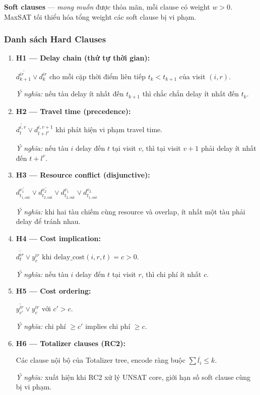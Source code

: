 \documentclass[11pt,a4paper]{article}
\begin{document}
\begin{softbox}
\textbf{Soft clauses} --- \emph{mong muốn} được thỏa mãn, mỗi clause có weight $w > 0$. MaxSAT tối thiểu hóa tổng weight các soft clause bị vi phạm.
\end{softbox}

\subsubsection{Danh sách Hard Clauses}

\begin{enumerate}
  \item \textbf{H1 --- Delay chain (thứ tự thời gian):}
  \begin{hardbox}
  $\overline{d_{k+1}^{ir}} \vee d_k^{ir}$ \quad cho mỗi cặp thời điểm liên tiếp $t_k < t_{k+1}$ của visit $(i,r)$.
  \end{hardbox}
  \emph{Ý nghĩa:} nếu tàu delay ít nhất đến $t_{k+1}$ thì chắc chắn delay ít nhất đến $t_k$.

  \item \textbf{H2 --- Travel time (precedence):}
  \begin{hardbox}
  $\overline{d_{t}^{i,v}} \vee d_{t+l^v}^{i,v+1}$ \quad khi phát hiện vi phạm travel time.
  \end{hardbox}
  \emph{Ý nghĩa:} nếu tàu $i$ delay đến $t$ tại visit $v$, thì tại visit $v+1$ phải delay ít nhất đến $t + l^v$.

  \item \textbf{H3 --- Resource conflict (disjunctive):}
  \begin{hardbox}
  $\overline{d_{t_{1,\text{out}}}^{v_1}} \vee \overline{d_{t_{2,\text{out}}}^{v_2}} \vee d_{t_{2,\text{out}}}^{v_1} \vee d_{t_{1,\text{out}}}^{v_2}$
  \end{hardbox}
  \emph{Ý nghĩa:} khi hai tàu chiếm cùng resource và overlap, ít nhất một tàu phải delay để tránh nhau.

  \item \textbf{H4 --- Cost implication:}
  \begin{hardbox}
  $\overline{d_t^{ir}} \vee y_c^{ir}$ \quad khi $\text{delay\_cost}(i, r, t) = c > 0$.
  \end{hardbox}
  \emph{Ý nghĩa:} nếu tàu $i$ delay đến $t$ tại visit $r$, thì chi phí ít nhất $c$.

  \item \textbf{H5 --- Cost ordering:}
  \begin{hardbox}
  $\overline{y_{c'}^{ir}} \vee y_c^{ir}$ \quad với $c' > c$.
  \end{hardbox}
  \emph{Ý nghĩa:} chi phí $\geq c'$ implies chi phí $\geq c$.

  \item \textbf{H6 --- Totalizer clauses (RC2):}
  \begin{hardbox}
  Các clause nội bộ của Totalizer tree, encode ràng buộc $\sum \overline{l_i} \leq k$.
  \end{hardbox}
  \emph{Ý nghĩa:} xuất hiện khi RC2 xử lý UNSAT core, giới hạn số soft clause cùng bị vi phạm.
\end{enumerate}
\end{document}
